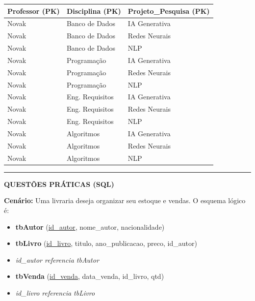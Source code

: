 \documentclass[12pt,a4paper]{article}
\newcommand{\resposta}[1]{
\noindent
\framebox[\textwidth]{
\begin{minipage}{0.98\textwidth}
\vspace{#1}
\end{minipage}
}
}
\begin{document}
\begin{enumerate}
    \begin{center}
        \begin{tabularx}{\textwidth}{|X|X|X|}
            \hline
            \cellcolor{gray!20}\textbf{Professor (PK)} & \cellcolor{gray!20}\textbf{Disciplina (PK)} & \cellcolor{gray!20}\textbf{Projeto\_Pesquisa (PK)} \\ \hline
            Novak & Banco de Dados & IA Generativa \\ \hline
            Novak & Banco de Dados & Redes Neurais \\ \hline
            Novak & Banco de Dados & NLP \\ \hline
            Novak & Programação & IA Generativa \\ \hline
            Novak & Programação & Redes Neurais \\ \hline
            Novak & Programação & NLP \\ \hline
            Novak & Eng. Requisitos & IA Generativa \\ \hline
            Novak & Eng. Requisitos & Redes Neurais \\ \hline
            Novak & Eng. Requisitos & NLP \\ \hline
            Novak & Algoritmos & IA Generativa \\ \hline
            Novak & Algoritmos & Redes Neurais \\ \hline
            Novak & Algoritmos & NLP \\ \hline
        \end{tabularx}
    \end{center}
    \resposta{6cm}

   
\end{enumerate}

\newpage
\begin{center}
    \rule{\textwidth}{0.4pt}
    \textbf{QUESTÕES PRÁTICAS (SQL)}
\end{center}

\textbf{Cenário:} Uma livraria deseja organizar seu estoque e vendas. O esquema lógico é:
\begin{itemize}[label={}]
    \item \textbf{tbAutor} (\underline{id\_autor}, nome\_autor, nacionalidade)
    \item \textbf{tbLivro} (\underline{id\_livro}, titulo, ano\_publicacao, preco, id\_autor)
    \item \textit{id\_autor referencia tbAutor}
    \item \textbf{tbVenda} (\underline{id\_venda}, data\_venda, id\_livro, qtd)
    \item \textit{id\_livro referencia tbLivro}
\end{itemize}
\end{document}
